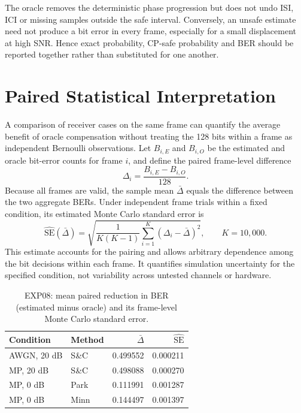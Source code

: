 The oracle removes the deterministic phase progression but does not undo ISI, ICI or missing samples outside the safe interval. Conversely, an unsafe estimate need not produce a bit error in every frame, especially for a small displacement at high SNR. Hence exact probability, CP-safe probability and BER should be reported together rather than substituted for one another.

\section[Paired Statistical Interpretation]{Paired Statistical Interpretation}
A comparison of receiver cases on the same frame can quantify the average benefit of oracle compensation without treating the 128 bits within a frame as independent Bernoulli observations. Let $B_{i,E}$ and $B_{i,O}$ be the estimated and oracle bit-error counts for frame $i$, and define the paired frame-level difference
\begin{equation}
\Delta_i=\frac{B_{i,E}-B_{i,O}}{128}.
\end{equation}
Because all frames are valid, the sample mean $\bar\Delta$ equals the difference between the two aggregate BERs. Under independent frame trials within a fixed condition, its estimated Monte Carlo standard error is
\begin{equation}
\widehat{\mathrm{SE}}(\bar\Delta)=
\sqrt{\frac{1}{K(K-1)}\sum_{i=1}^{K}(\Delta_i-\bar\Delta)^2},
\qquad K=10{,}000.
\end{equation}
This estimate accounts for the pairing and allows arbitrary dependence among the bit decisions within each frame. It quantifies simulation uncertainty for the specified condition, not variability across untested channels or hardware.

\begin{table}[!htbp]
\centering\small
\caption[EXP08: paired BER reductions.]{EXP08: mean paired reduction in BER (estimated minus oracle) and its frame-level Monte Carlo standard error.}
\label{tab:ch5paired}
\begin{tabular}{llrr}\hline
Condition&Method&$\bar\Delta$&$\widehat{\mathrm{SE}}$\\\hline
AWGN, 20 dB&S\&C&0.499552&0.000211\\
MP, 20 dB&S\&C&0.498088&0.000270\\
MP, 0 dB&Park&0.111991&0.001287\\
MP, 0 dB&Minn&0.144497&0.001397\\\hline
\end{tabular}
\end{table}

